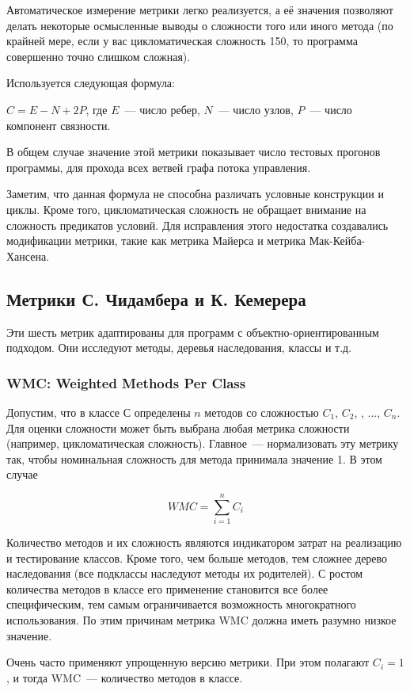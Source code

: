 \documentclass{../../text-style}
\begin{document}
Автоматическое измерение метрики легко реализуется, а её значения позволяют делать некоторые осмысленные выводы о сложности того или иного метода (по крайней мере, если у вас цикломатическая сложность 150, то программа совершенно точно слишком сложная).

Используется следующая формула:

$C = E - N + 2P$, где $E$~--- число ребер, $N$~--- число узлов, $P$~--- число компонент связности.

В общем случае значение этой метрики показывает число тестовых прогонов программы, для прохода всех ветвей графа потока управления.

Заметим, что данная формула не способна различать условные конструкции и циклы. Кроме того, цикломатическая сложность не обращает внимание на сложность предикатов условий. Для исправления этого недостатка создавались модификации метрики, такие как метрика Майерса и метрика Мак-Кейба-Хансена.

\subsection{Метрики С. Чидамбера и К. Кемерера}

Эти шесть метрик адаптированы для программ с объектно-ориентированным подходом. Они исследуют методы, деревья наследования, классы и т.д.

\subsubsection{WMC: Weighted Methods Per Class}
Допустим, что в классе $С$ определены $n$ методов со сложностью $C_1$, $C_2$, , ..., $C_n$. Для оценки сложности может быть выбрана любая метрика сложности (например, цикломатическая сложность). Главное~--- нормализовать эту метрику так, чтобы номинальная сложность для метода принимала значение 1. В этом случае

$$WMC = \sum_{i=1}^{n}C_i$$

Количество методов и их сложность являются индикатором затрат на реализацию и тестирование классов. Кроме того, чем больше методов, тем сложнее дерево наследования (все подклассы наследуют методы их родителей). С ростом количества методов в классе его применение становится все более специфическим, тем самым ограничивается возможность многократного использования. По этим причинам метрика WMC должна иметь разумно низкое значение.

Очень часто применяют упрощенную версию метрики. При этом полагают $C_i = 1$, и тогда WMC~--- количество методов в классе.
\end{document}
